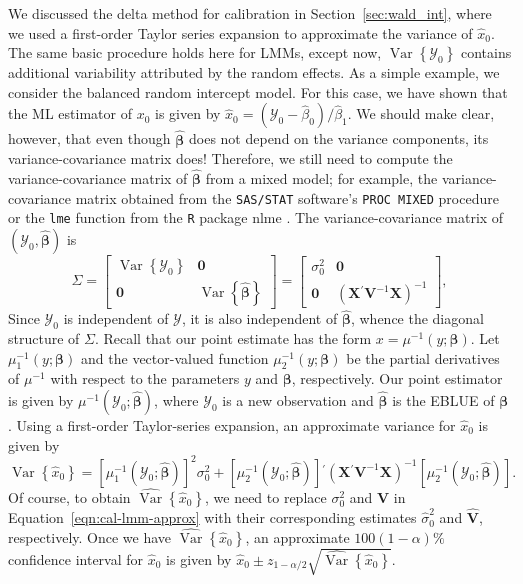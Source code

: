 \documentclass[cmfont,usenames,dvipsnames,leqno]{afit-etd}\usepackage[]{graphicx}\usepackage[]{color}
\newcommand{\code}[1]{\texttt{\small{#1}}}
\newcommand{\pkg}[1]{\textsf{\small{#1}}}
\newcommand{\trans}{\ensuremath{^\prime}}
\newcommand{\bc}[1]{\ensuremath{\bm{\mathcal{#1}}}}
\newcommand{\mc}[1]{\ensuremath{\mathcal{#1}}}
\newcommand{\wh}[1]{\ensuremath{\widehat{#1}}}
\newcommand{\var}{\operatorname{Var}}
\newcommand{\X}{\ensuremath{\bm{X}}}
\begin{document}
We discussed the delta method for calibration in Section~\ref{sec:wald_int}, where we used a first-order Taylor series expansion to approximate the variance of $\wh{x}_0$. The same basic procedure holds here for LMMs, except now, $\var\left\{\mc{Y}_0\right\}$ contains additional variability attributed by the random effects. As a simple example, we consider the balanced random intercept model. For this case, we have shown that the ML estimator of $x_0$ is given by $\wh{x}_0 = \left(\mc{Y}_0 - \wh{\beta}_0\right)/\wh{\beta}_1$. We should make clear, however, that even though $\wh{\bm{\beta}}$ does not depend on the variance components, its variance-covariance matrix does! Therefore, we still need to compute the variance-covariance matrix of $\wh{\bm{\beta}}$ from a mixed model; for example, the variance-covariance matrix obtained from the \code{SAS/STAT} \citep{sas_program} software's \code{PROC MIXED} procedure or the \code{lme} function from the \code{R} package \pkg{nlme} \citep{pinheiro_nlme_2013}. The variance-covariance matrix of $\left(\mc{Y}_0, \wh{\bm{\beta}}\right)$ is
\begin{equation}
\label{eqn:Sigma}
\Sigma = \begin{bmatrix}
           \var\left\{\mc{Y}_0\right\} & \bm{0} \\
           \bm{0} & \var\left\{\wh{\bm{\beta}}\right\}
         \end{bmatrix} = \begin{bmatrix}
           \sigma_0^2 & \bm{0} \\
           \bm{0} & \left(\X\trans\bm{V}^{-1}\X\right)^{-1}
         \end{bmatrix},
\end{equation} 
Since $\mc{Y}_0$ is independent of $\bc{Y}$, it is also independent of $\wh{\bm{\beta}}$, whence the diagonal structure of $\Sigma$. Recall that our point estimate has the form $x = \mu^{-1}\left(y; \bm{\beta}\right)$. Let $\mu_1^{-1}\left(y; \bm{\beta}\right)$ and the vector-valued function $\mu_2^{-1}\left(y; \bm{\beta}\right)$ be the partial derivatives of $\mu^{-1}$ with respect to the parameters $y$ and $\bm{\beta}$, respectively. Our point estimator is given by $\mu^{-1}\left(\mc{Y}_0; \wh{\bm{\beta}}\right)$, where $\mc{Y}_0$ is a new observation and $\wh{\bm{\beta}}$ is the EBLUE of $\bm{\beta}$. Using a first-order Taylor-series expansion, an approximate variance for $\wh{x}_0$ is given by
\begin{equation}
\label{eqn:cal-lmm-approx}
  \var\left\{\wh{x}_0\right\} = \left[\mu_1^{-1}\left(\mc{Y}_0; \wh{\bm{\beta}}\right)\right]^2\sigma_0^2 + \left[\mu_2^{-1}\left(\mc{Y}_0; \wh{\bm{\beta}}\right)\right]\trans\left(\X\trans\bm{V}^{-1}\X\right)^{-1}\left[\mu_2^{-1}\left(\mc{Y}_0; \wh{\bm{\beta}}\right)\right].
\end{equation}
Of course, to obtain $\wh{\var}\left\{\wh{x}_0\right\}$, we need to replace $\sigma_0^2$ and $\bm{V}$ in Equation~\eqref{eqn:cal-lmm-approx} with their corresponding estimates $\wh{\sigma}_0^2$ and $\wh{\bm{V}}$, respectively. Once we have $\wh{\var}\left\{\wh{x}_0\right\}$, an approximate $100(1-\alpha)\%$ confidence interval for $\wh{x}_0$ is given by $\wh{x}_0 \pm z_{1-\alpha/2}\sqrt{\wh{\var}\left\{\wh{x}_0\right\}}$.
\end{document}
